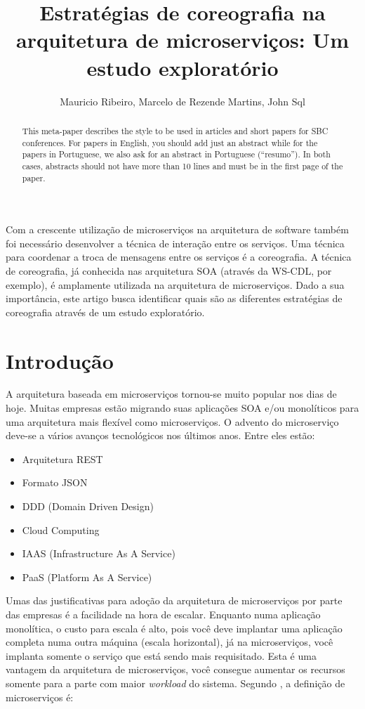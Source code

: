 \documentclass[12pt]{article}
\title{Estratégias de coreografia na arquitetura de microserviços: Um estudo exploratório}
\author{Mauricio Ribeiro\inst{1}, Marcelo de Rezende Martins\inst{1}, John Sql\inst{1} }
\theoremstyle{plain}
\begin{document}
 

\maketitle

\begin{abstract}
  This meta-paper describes the style to be used in articles and short papers
  for SBC conferences. For papers in English, you should add just an abstract
  while for the papers in Portuguese, we also ask for an abstract in
  Portuguese (``resumo''). In both cases, abstracts should not have more than
  10 lines and must be in the first page of the paper.
\end{abstract}
     
\begin{resumo} 
  Com a crescente utilização de microserviços na arquitetura de software também foi necessário desenvolver a técnica de interação entre os serviços. Uma técnica para coordenar a troca de mensagens entre os serviços é a coreografia. A técnica de coreografia, já conhecida nas arquitetura SOA (através da WS-CDL, por exemplo), é amplamente utilizada na arquitetura de microserviços. Dado a sua importância, este artigo busca identificar quais são as diferentes estratégias de coreografia através de um estudo exploratório. 
\end{resumo}


\section{Introdução}

A arquitetura baseada em microserviços tornou-se muito popular nos dias de hoje. Muitas empresas estão migrando suas aplicações SOA e/ou monolíticos para uma arquitetura mais flexível como microserviços. O advento do microserviço deve-se a vários avanços tecnológicos nos últimos anos. Entre eles estão:
\begin{itemize}
    \item Arquitetura REST
    \item Formato JSON
    \item DDD (Domain Driven Design)
    \item Cloud Computing
    \item IAAS (Infrastructure As A Service)
    \item PaaS (Platform As A Service)
\end{itemize}
Umas das justificativas para adoção da arquitetura de microserviços por parte das empresas é a facilidade na hora de escalar. Enquanto numa aplicação monolítica, o custo para escala é alto, pois você deve implantar uma aplicação completa numa outra máquina (escala horizontal), já na microserviços, você implanta somente o serviço que está sendo mais requisitado. Esta é uma vantagem da arquitetura de microserviços, você consegue aumentar os recursos somente para a parte com maior \textit{workload} do sistema. 
Segundo \cite{Dragoni2017}, a definição de microserviços é:
\end{document}
